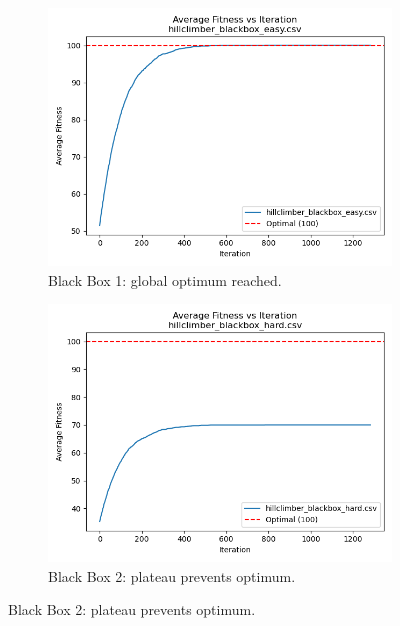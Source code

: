\documentclass[11pt]{article}
\begin{document}
\begin{figure}[H]
    \centering
    \begin{subfigure}[b]{0.45\textwidth}
        \centering
        \includegraphics[width=\textwidth]{hillclimber_blackbox_easy.png}
        \caption{Black Box 1: global optimum reached.}
        \label{fig:blackbox1-plot}
    \end{subfigure}
    \hfill
    \begin{subfigure}[b]{0.45\textwidth}
        \centering
        \includegraphics[width=\textwidth]{hillclimber_blackbox_hard.png}
        \caption{Black Box 2: plateau prevents optimum.}
        \label{fig:blackbox2-plot}
    \end{subfigure}


\end{figure}
\end{document}
